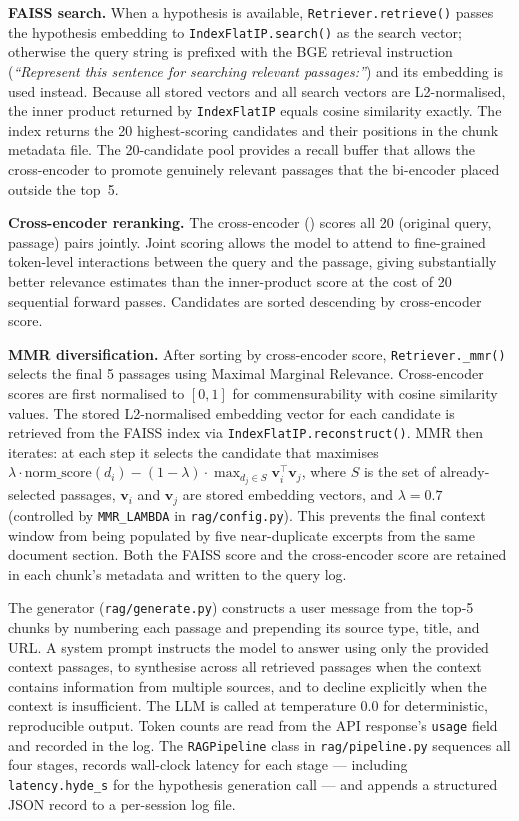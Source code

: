 \textbf{FAISS search.} When a hypothesis is available, \texttt{Retriever.retrieve()} passes the hypothesis embedding to \texttt{IndexFlatIP.search()} as the search vector; otherwise the query string is prefixed with the BGE retrieval instruction (\textit{``Represent this sentence for searching relevant passages:''}) and its embedding is used instead. Because all stored vectors and all search vectors are L2-normalised, the inner product returned by \texttt{IndexFlatIP} equals cosine similarity exactly. The index returns the 20 highest-scoring candidates and their positions in the chunk metadata file. The 20-candidate pool provides a recall buffer that allows the cross-encoder to promote genuinely relevant passages that the bi-encoder placed outside the top~5.

\begin{sloppypar}
\textbf{Cross-encoder reranking.} The cross-encoder () scores all 20 (original query, passage) pairs jointly. Joint scoring allows the model to attend to fine-grained token-level interactions between the query and the passage, giving substantially better relevance estimates than the inner-product score at the cost of 20 sequential forward passes. Candidates are sorted descending by cross-encoder score.
\end{sloppypar}

\textbf{MMR diversification.} After sorting by cross-encoder score, \texttt{Retriever.\_mmr()} selects the final 5 passages using Maximal Marginal Relevance. Cross-encoder scores are first normalised to $[0,1]$ for commensurability with cosine similarity values. The stored L2-normalised embedding vector for each candidate is retrieved from the FAISS index via \texttt{IndexFlatIP.reconstruct()}. MMR then iterates: at each step it selects the candidate that maximises $\lambda \cdot \text{norm\_score}(d_i) - (1-\lambda) \cdot \max_{d_j \in S} \mathbf{v}_i^\top \mathbf{v}_j$, where $S$ is the set of already-selected passages, $\mathbf{v}_i$ and $\mathbf{v}_j$ are stored embedding vectors, and $\lambda = 0.7$ (controlled by \texttt{MMR\_LAMBDA} in \texttt{rag/config.py}). This prevents the final context window from being populated by five near-duplicate excerpts from the same document section. Both the FAISS score and the cross-encoder score are retained in each chunk's metadata and written to the query log.

The generator (\texttt{rag/generate.py}) constructs a user message from the top-5 chunks by numbering each passage and prepending its source type, title, and URL. A system prompt instructs the model to answer using only the provided context passages, to synthesise across all retrieved passages when the context contains information from multiple sources, and to decline explicitly when the context is insufficient. The LLM is called at temperature 0.0 for deterministic, reproducible output. Token counts are read from the API response's \texttt{usage} field and recorded in the log. The \texttt{RAGPipeline} class in \texttt{rag/pipeline.py} sequences all four stages, records wall-clock latency for each stage — including \texttt{latency.hyde\_s} for the hypothesis generation call — and appends a structured JSON record to a per-session log file.

